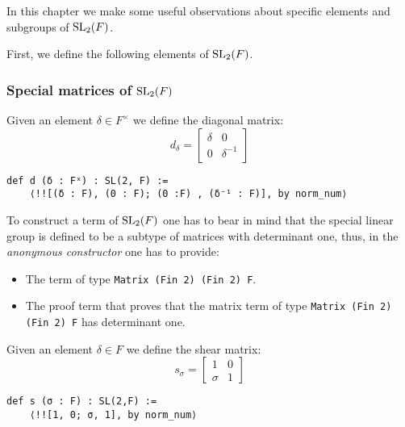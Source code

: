 In this chapter we make some useful observations about specific elements and subgroups of $\operatorname{SL}_2(F)$. 

First, we define the following elements of $\operatorname{SL}_2(F)$.

\subsubsection{Special matrices of $\operatorname{SL}_2(F)$}

\begin{definition}
\label{SpecialMatrices.d}
\leanok
    Given an element $\delta \in F^\times$ we define the diagonal matrix:
    \[
    d_\delta = \begin{bmatrix}
        \delta & 0\\
        0 & \delta^{-1}
    \end{bmatrix}
    \]
\end{definition}
\begin{footnotesize}
\begin{verbatim}
def d (δ : Fˣ) : SL(2, F) :=
    ⟨!![(δ : F), (0 : F); (0 :F) , (δ⁻¹ : F)], by norm_num⟩
\end{verbatim}
\end{footnotesize}

\begin{remark}
    To construct a term of $\operatorname{SL}_2(F)$ one has to bear in mind that the special linear group is defined to
    be a subtype of matrices with determinant one, thus, in the \textit{anonymous constructor}
    one has to provide:

    \begin{itemize}
        \item The term of type \texttt{Matrix (Fin 2) (Fin 2) F}.
        \item The proof term that proves that the matrix term of type \texttt{Matrix (Fin 2) (Fin 2) F} has determinant one.
    \end{itemize}
\end{remark}

\begin{definition}
\label{SpecialMatrices.s}
\leanok
    Given an element $\delta \in F$ we define the shear matrix:
    \[
    s_\sigma  = \begin{bmatrix}
    1 & 0\\
    \sigma & 1
    \end{bmatrix}
    \]
\end{definition}
\begin{footnotesize}
\begin{verbatim}
def s (σ : F) : SL(2,F) :=
    ⟨!![1, 0; σ, 1], by norm_num⟩
\end{verbatim}
\end{footnotesize}

